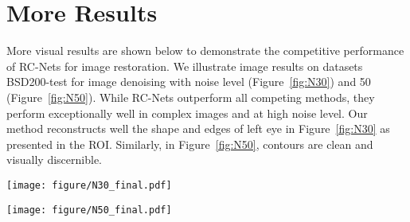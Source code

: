 \documentclass[10pt,twocolumn,letterpaper]{article}
\begin{document}
\section{More Results}
More visual results are shown below to demonstrate the competitive performance of RC-Nets for image restoration. We illustrate image results on datasets BSD200-test for image denoising with noise level  (Figure~\ref{fig:N30}) and 50 (Figure~\ref{fig:N50}). While RC-Nets outperform all competing methods, they perform exceptionally well in complex images and at high noise level. Our method reconstructs well the shape and edges of left eye in Figure~\ref{fig:N30} as presented in the ROI. Similarly, in Figure~\ref{fig:N50}, contours are clean and visually discernible.



\begin{figure*}[h!]

 \caption{\small \textbf{Image Denoising:} Visual results of one image from BSD200-test with  along with PSNR(dB) / SSIM. Compares to state-of-the-art method, our RC-Net well recovers facial features of kids, especially the eyes are almost identical to the ground truth while state-of-the-art methods lose contours and details because of the high noise level. } 
  \texttt{[image: figure/N30\_final.pdf]}
 
\label{fig:N30}
\end{figure*}

\begin{figure*}[h!]

  \caption{\small \textbf{Image Denoising:} Visual results of one image from BSD200-test with noise level of   along with PSNR(dB) / SSIM. Horn and ears of rhinoceros are accurately reproduced using our RC-Net method. Bushes an woods in the background are discernible instead of the blurred restoration from other state-of-the-art methods. } 
  \texttt{[image: figure/N50\_final.pdf]}

\label{fig:N50}
\end{figure*}
\end{document}
